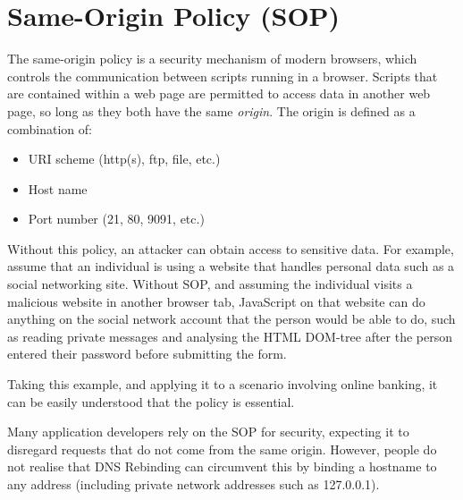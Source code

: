 \chapter{Same-Origin Policy (SOP)}

The same-origin policy is a security mechanism of modern browsers, which
controls the communication between scripts running in a browser. Scripts that
are contained within a web page are permitted to access data in another web
page, so long as they both have the same \emph{origin}. The origin is defined
as a combination of:
\begin{itemize}
	\item{URI scheme (http(s), ftp, file, etc.)}
	\item{Host name}
	\item{Port number (21, 80, 9091, etc.)}
\end{itemize}

Without this policy, an attacker can obtain access to sensitive data. For
example, assume that an individual is using a website that handles personal
data
such as a social networking site. Without SOP, and assuming the individual
visits a malicious website in another browser tab, JavaScript on that website
can do anything on the social network account that the person would be able to
do, such as reading private messages and analysing the HTML DOM-tree after
the person entered their password before submitting the form.

Taking this example, and applying it to a scenario involving online banking, it
can be easily understood that the policy is essential.

Many application developers rely on the SOP for security, expecting it to
disregard requests that do not come from the same origin. However, people do
not realise that DNS Rebinding can circumvent this by binding a hostname to
any address (including private network addresses such as 127.0.0.1).
